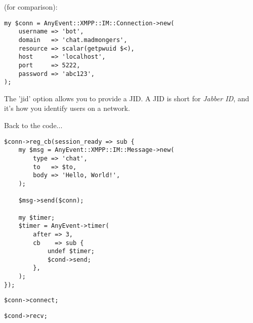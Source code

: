 (for comparison):

\begin{shaded}
\begin{verbatim}
my $conn = AnyEvent::XMPP::IM::Connection->new(
    username => 'bot',
    domain   => 'chat.madmongers',
    resource => scalar(getpwuid $<),
    host     => 'localhost',
    port     => 5222,
    password => 'abc123',
);
\end{verbatim}
\end{shaded}

\pause
The 'jid' option allows you to provide a JID.  A JID is short for \textit{Jabber ID}, and it's how
you identify users on a network.

\newpage

Back to the code...

\pause

\begin{shaded}
\begin{verbatim}
$conn->reg_cb(session_ready => sub {
    my $msg = AnyEvent::XMPP::IM::Message->new(
        type => 'chat',
        to   => $to,
        body => 'Hello, World!',
    );

    $msg->send($conn);

    my $timer;
    $timer = AnyEvent->timer(
        after => 3,
        cb    => sub {
            undef $timer;
            $cond->send;
        },
    );
});
\end{verbatim}
\end{shaded}

\pause
\begin{shaded}
\begin{verbatim}
$conn->connect;
\end{verbatim}
\end{shaded}

\pause
\begin{shaded}
\begin{verbatim}
$cond->recv;
\end{verbatim}
\end{shaded}
